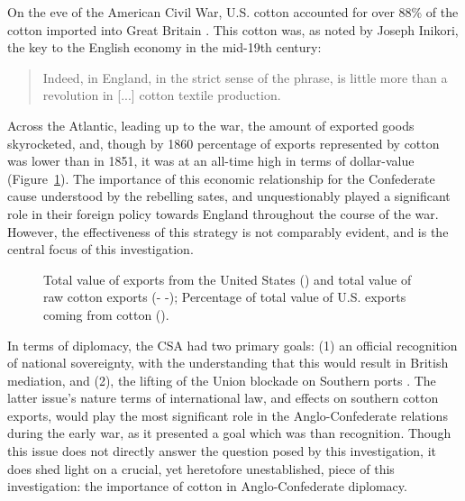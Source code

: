 
\Autocites(Data in Figure~\ref{fig: B.i}:)()[Total exports:][Part 2, Table 2]{u.s.congressImportsduties1884}[Cotton exports:][Table A-III]{northeconomicgrowth1966}
On the eve of the American Civil War, U.S. cotton accounted for over 88\% of the cotton imported into Great Britain \autocite[40]{baileyOtherSide1994}. This 
cotton was, as noted by Joseph Inikori, the key to the English economy in the mid-19th century: 
\begin{quote}
    Indeed,  in England, in the strict sense of the phrase, is little more than a revolution in [...] cotton textile production.
    \autocite[Joseph Inikori, {The Slave Trade and Revolution in Cotton Textile Production in England}, quoted in][40]{baileyOtherSide1994}
\end{quote}
Across the Atlantic, leading up to the war, the amount of exported goods skyrocketed, 
and, though by 1860 percentage of exports represented by cotton was lower than in 1851, it was at an all-time high in 
terms of dollar-value (Figure~\ref{fig: B.i}). The importance of this economic relationship for the Confederate cause understood by the rebelling sates, 
and unquestionably played a significant role in their foreign policy towards England throughout the course of the war. However, the effectiveness of this strategy 
is not comparably evident, and is the central focus of this investigation. 

\begin{figure}[ht]
    \centering
    
    \caption{
        Total value of exports from the United States (\textemdash) 
        and total value of raw cotton exports (- -);
        Percentage of total value of U.S. exports coming from cotton (\textcolor{red!75!black}{\textemdash}).
    }
    \label{fig: B.i}
\end{figure} 

In terms of diplomacy, the CSA had two primary goals: (1) an official recognition of national sovereignty, with the
understanding that this would result in British mediation, and (2), the lifting of the Union blockade on Southern ports
\Autocites()()[][383]{mcphersonBattleCry1988}[W.L. Yancey and A. Dudley Mann $\rightarrow$ Secretary of State R. Toombs, July 15, 1861, in:][45]{davismessagespapers1966}.
The latter issue's nature terms of international law, and effects on southern cotton exports, would play the most significant role in
the Anglo-Confederate relations during the early war, as it presented a goal which was  than
recognition\autocite[John Slidell $\rightarrow$ Secretary of State R.M.T. Hunter, September 26, 1862, in:][187]{davismessagespapers1966}. Though this issue does not
directly answer the question posed by this investigation, it does shed light on a 
crucial, yet heretofore unestablished, piece of this investigation: the importance of cotton in Anglo-Confederate diplomacy. 

